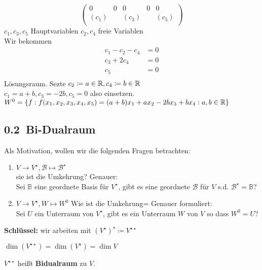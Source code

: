 \begin{subexample}
\[\begin{pmatrix}
			0 & 0 & 0 & 0 & 0 \\
			(c_1) & ~ & (c_3) & ~ & (c_5)\\
		\end{pmatrix} 
	\]
	$ c_1, c_3, c_5 $ Hauptvariablen $ c_2, c_4 $ freie Variablen\\
	Wir bekommen
	\begin{align*}
		c_1 - c_2 - c_4 &= 0 \\
		c_3 + 2c_4 &= 0 \\
		c_5 &= 0 \\
	\end{align*}
	Lösungsraum. Sezte $ c_2 \coloneqq a \in \mathbb{R} , c_4 \coloneqq b \in \mathbb{R} $\\
	$ c_1 = a + b, c_3 = -2b, c_5 = 0 $ also einsetzen.\\
	$ W^0 = \left\{ f : f(x_1, x_2, x_3, x_4, x_5) = (a+b)x_1 + ax_2 - 2bx_3 + bx_4 : a, b \in \mathbb{R}  \right\}  $
\end{subexample}

\subsection*{0.2~Bi-Dualraum}
Als Motivation, wollen wir die folgenden Fragen betrachten:
\begin{enumerate}[label=(\arabic*)]
	\item $ V \to V^\star, \mathcal{B} \mapsto \mathcal{B}^\star  $\\
		sie ist die Umkehrung? Genauer:\\
		Sei $ \mathbb{B} $ eine geordnete Basis für $ V^\star $, gibt es eine geordnete $ \mathcal{B}  $ für $ V $ s.d. $ \mathcal{B} ^\star = \mathbb{B} $?
	\item $ V \to V^\star, W \mapsto W^0 $ Wie ist die Umkehrung= Genauer formuliert:\\
		Sei $ U $ ein Unterraum von $ V^\star  $, gibt es ein Unterraum $ W $ von $ V $ so dass $ W^0 = U $?
\end{enumerate}

\textbf{Schlüssel:} wir arbeiten mit $ \left( V^\star  \right) ^\star \coloneqq V^{\star \star }  $

\setcounter{subenvironmentnumber}{1}
\begin{subexample}
	$ \dim(V^{\star \star }) = \dim(V^\star ) = \dim V  $
\end{subexample}

\begin{subdefinition}[Bi-Dualraum]
	$ V^{\star \star }  $ heißt \textbf{Bidualraum} zu $ V $.
\end{subdefinition}

